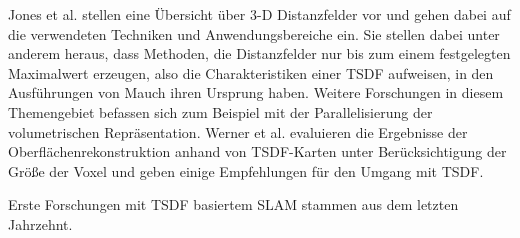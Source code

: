 Jones et al. \cite{jones2006distance} stellen eine Übersicht über 3-D Distanzfelder vor und gehen dabei auf die verwendeten Techniken und Anwendungsbereiche ein. Sie stellen dabei unter anderem heraus, dass Methoden, die Distanzfelder nur bis zum einem festgelegten Maximalwert erzeugen, also die Charakteristiken einer TSDF aufweisen, in den Ausführungen von Mauch \cite{mauch200fast, mauch2003efficient} ihren Ursprung haben. Weitere Forschungen in diesem Themengebiet befassen sich zum Beispiel mit der Parallelisierung der volumetrischen Repräsentation. Werner et al. \cite{werner2014truncated} evaluieren die Ergebnisse der Oberflächenrekonstruktion anhand von TSDF-Karten unter Berücksichtigung der Größe der Voxel und geben einige Empfehlungen für den Umgang mit TSDF.

Erste Forschungen mit TSDF basiertem SLAM stammen aus dem letzten Jahrzehnt.
